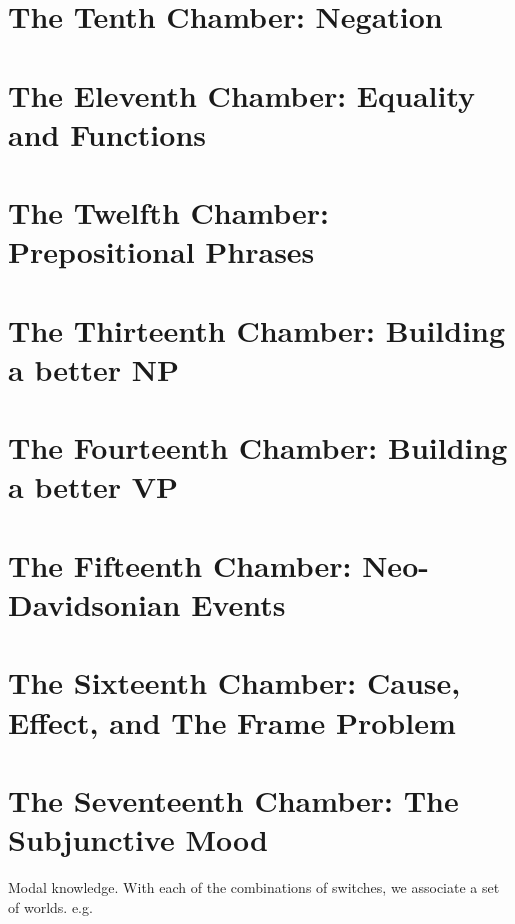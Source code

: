 \documentclass{book}[9pt]
\begin{document}
\chapter{The Tenth Chamber: Negation}

\chapter{The Eleventh Chamber: Equality and Functions}

\chapter{The Twelfth Chamber: Prepositional Phrases}

\chapter{The Thirteenth Chamber: Building a better NP}

\chapter{The Fourteenth Chamber: Building a better VP}

\chapter{The Fifteenth Chamber: Neo-Davidsonian Events}

\chapter{The Sixteenth Chamber: Cause, Effect, and The Frame Problem} 

\chapter{The Seventeenth Chamber: The Subjunctive Mood}

Modal knowledge.  With each of the combinations of switches, we
associate a set of worlds.  e.g.
\end{document}
